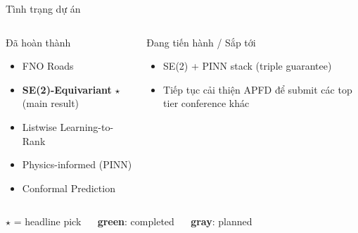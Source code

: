 \documentclass[aspectratio=169,10pt]{beamer}
\begin{document}
\begin{frame}{Tình trạng dự án}
\begin{columns}[T]
\begin{block}{Đã hoàn thành}
\scriptsize
\begin{itemize}
  \item FNO Roads
  \item \textbf{SE(2)-Equivariant} $\star$ (main result)
  \item Listwise Learning-to-Rank
  \item Physics-informed (PINN)
  \item Conformal Prediction
\end{itemize}
\end{block}

\begin{block}{Đang tiến hành / Sắp tới}
\scriptsize
\begin{itemize}
  \item SE(2) + PINN stack (triple guarantee)
  \item Tiếp tục cải thiện APFD để submit các top tier conference khác
\end{itemize}
\end{block}
\end{columns}

\vspace{1em}
\centering\scriptsize
$\star$ = headline pick $\quad$
\textcolor{success!50!black}{\textbf{green}}: completed $\quad$
\textcolor{mDarkTeal}{\textbf{gray}}: planned
\end{frame}
\end{document}
